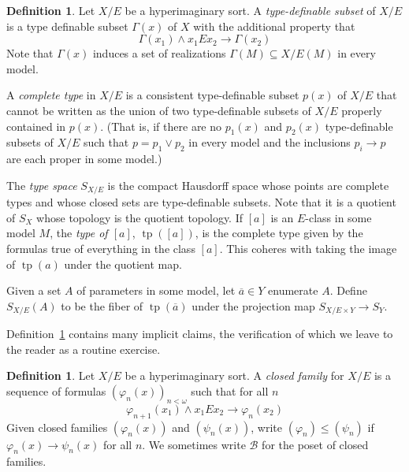 \documentclass{article}
\theoremstyle{definition}
\newtheorem{definition}[theorem]{Definition}
\newcommand{\defterm}{\emph}
\newcommand{\B}{\mathcal{B}}
\DeclareMathOperator{\tp}{tp}
\begin{document}
\begin{definition}\label{definition:type-basics}
  Let $X/E$ be a hyperimaginary sort. A \defterm{type-definable subset} of $X/E$ is a type definable subset $\Gamma(x)$ of $X$ with the additional property that
  \begin{equation*}
    \Gamma(x_1) \wedge x_1 E x_2 \rightarrow \Gamma(x_2)
  \end{equation*}
  Note that $\Gamma(x)$ induces a set of realizations $\Gamma(M) \subseteq X/E(M)$ in every model.

  A \defterm{complete type} in $X/E$ is a consistent type-definable subset $p(x)$ of $X/E$ that cannot be written as the union of two type-definable subsets of $X/E$ properly contained in $p(x)$. (That is, if there are no $p_1(x)$ and $p_2(x)$ type-definable subsets of $X/E$ such that $p = p_1 \vee p_2$ in every model and the inclusions $p_i \rightarrow p$ are each proper in some model.)

  The \defterm{type space} $S_{X/E}$ is the compact Hausdorff space whose points are complete types and whose closed sets are type-definable subsets. Note that it is a quotient of $S_X$ whose topology is the quotient topology. If $[a]$ is an $E$-class in some model $M$, the \defterm{type of $[a]$}, $\tp([a])$, is the complete type given by the formulas true of everything in the class $[a]$. This coheres with taking the image of $\tp(a)$ under the quotient map.

  Given a set $A$ of parameters in some model, let $\overline{a} \in Y$ enumerate $A$. Define $S_{X/E}(A)$ to be the fiber of $\tp(\overline{a})$ under the projection map $S_{X/E \times Y} \to S_Y$.
\end{definition}

Definition~\ref{definition:type-basics} contains many implicit claims, the verification of which we leave to the reader as a routine exercise.

\begin{definition}
  Let $X/E$ be a hyperimaginary sort. A \defterm{closed family} for $X/E$ is a sequence of formulas $(\varphi_n(x))_{n < \omega}$ such that for all $n$
  \begin{equation*}
    \varphi_{n+1}(x_1) \wedge x_1 E x_2 \rightarrow \varphi_n(x_2)
  \end{equation*}
  Given closed families $(\varphi_n(x))$ and $(\psi_n(x))$, write $(\varphi_n) \leq (\psi_n)$ if $\varphi_n(x) \rightarrow \psi_n(x)$ for all $n$. We sometimes write $\B$ for the poset of closed families.
\end{definition}
\end{document}
